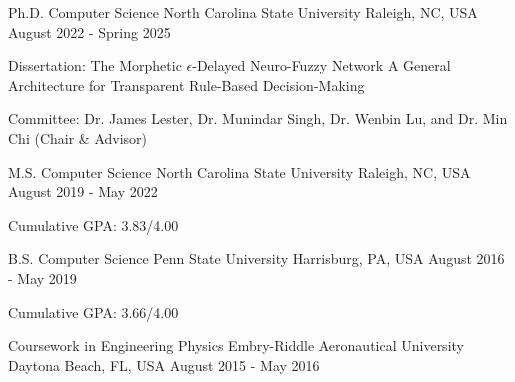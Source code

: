 

\begin{cventries}

  \cventry
    {Ph.D. Computer Science} %
    {North Carolina State University} %
    {Raleigh, NC, USA} %
    {August 2022 - Spring 2025} %
    {
      \begin{cvitems} %
        \item {Dissertation: {\footnotesize The Morphetic $\epsilon$-Delayed Neuro-Fuzzy Network \textemdash A General Architecture for Transparent Rule-Based Decision-Making}}
        \item {Committee: Dr. James Lester, Dr. Munindar Singh, Dr. Wenbin Lu, and Dr. Min Chi (Chair \& Advisor)}
      \end{cvitems}
    }

  \cventry
    {M.S. Computer Science} %
    {North Carolina State University} %
    {Raleigh, NC, USA} %
    {August 2019 - May 2022} %
    {
      \begin{cvitems} %
        \item {Cumulative GPA: 3.83/4.00}
      \end{cvitems}
    }

  \cventry
    {B.S. Computer Science} %
    {Penn State University} %
    {Harrisburg, PA, USA} %
    {August 2016 - May 2019} %
    {
      \begin{cvitems} %
        \item {Cumulative GPA: 3.66/4.00}
      \end{cvitems}
    }

  \cventry
    {Coursework in Engineering Physics} %
    {Embry-Riddle Aeronautical University} %
    {Daytona Beach, FL, USA} %
    {August 2015 - May 2016} %
        {
    }

\end{cventries}

\vspace{-24pt}